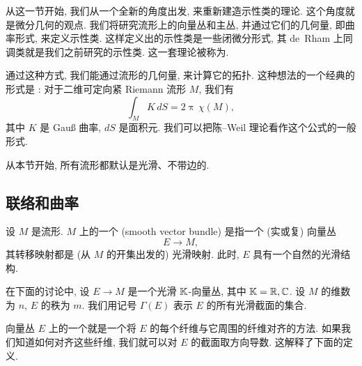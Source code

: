 从这一节开始, 我们从一个全新的角度出发, 来重新建造示性类的理论.
这个角度就是微分几何的观点.
我们将研究流形上的向量丛和主丛,
并通过它们的几何量, 即曲率形式, 来定义示性类.
这样定义出的示性类是一些闭微分形式, 其 de~Rham 上同调类就是我们之前研究的示性类.
这一套理论被称为.

通过这种方式, 我们能通过流形的几何量, 来计算它的拓扑.
这种想法的一个经典的形式是 :
对于二维可定向紧 Riemann 流形 $M$, 我们有
\[ \int_M K \, d S = 2 \uppi \, \chi (M), \]
其中 $K$ 是 Gauß 曲率, $dS$ 是面积元.
我们可以把陈--Weil 理论看作这个公式的一般形式.

从本节开始, 所有流形都默认是光滑、不带边的.


\subsection{联络和曲率}

\begin{definition}
    设 $M$ 是流形. $M$ 上的一个 (smooth vector bundle)
    是指一个 (实或复) 向量丛
    \[ E \to M, \]
    其转移映射都是 (从 $M$ 的开集出发的) 光滑映射.
    此时, $E$ 具有一个自然的光滑结构.
\end{definition}

在下面的讨论中, 设 $E \to M$ 是一个光滑 $\mathbb{K}$-向量丛, 其中 $\mathbb{K} = \mathbb{R}, \mathbb{C}$.
设 $M$ 的维数为 $n$, $E$ 的秩为 $m$.
我们用记号 $\Gamma (E)$ 表示 $E$ 的所有光滑截面的集合.

向量丛 $E$ 上的一个就是一个将
$E$ 的每个纤维与它周围的纤维对齐的方法.
如果我们知道如何对齐这些纤维, 我们就可以对 $E$ 的截面取方向导数.
这解释了下面的定义.

